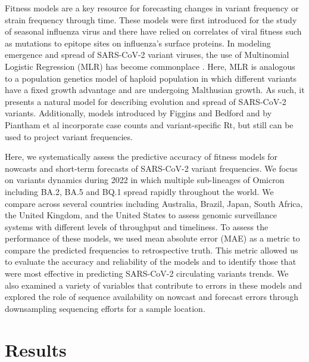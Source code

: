 \documentclass[11pt,oneside,letterpaper]{article}
\begin{document}
Fitness models are a key resource for forecasting changes in variant frequency or strain frequency through time.
These models were first introduced for the study of seasonal influenza virus \cite{luksza2014predictive, morris2018predictive, huddleston2020integrating} and there have relied on correlates of viral fitness such as mutations to epitope sites on influenza's surface proteins.
In modeling emergence and spread of SARS-CoV-2 variant viruses, the use of Multinomial Logistic Regression (MLR) has become commonplace \cite{annavajhala2021emergence, faria2021genomics, obermeyer2022analysis}.
Here, MLR is analogous to a population genetics model of haploid population in which different variants have a fixed growth advantage and are undergoing Malthusian growth.
As such, it presents a natural model for describing evolution and spread of SARS-CoV-2 variants.
Additionally, models introduced by Figgins and Bedford \cite{figgins2022sars} and by Piantham et al \cite{piantham2021estimating} incorporate case counts and variant-specific Rt, but still can be used to project variant frequencies.

Here, we systematically assess the predictive accuracy of fitness models for nowcasts and short-term forecasts of SARS-CoV-2 variant frequencies.
We focus on variants dynamics during 2022 in which multiple sub-lineages of Omicron including BA.2, BA.5 and BQ.1 spread rapidly throughout the world.
We compare across several countries including Australia, Brazil, Japan, South Africa, the United Kingdom, and the United States to assess genomic surveillance systems with different levels of throughput and timeliness.
To assess the performance of these models, we used mean absolute error (MAE) as a metric to compare the predicted frequencies to retrospective truth.
This metric allowed us to evaluate the accuracy and reliability of the models and to identify those that were most effective in predicting SARS-CoV-2 circulating variants trends.
We also examined a variety of variables that contribute to errors in these models and explored the role of sequence availability on nowcast and forecast errors through downsampling sequencing efforts for a sample location.

\section*{Results}
\end{document}
